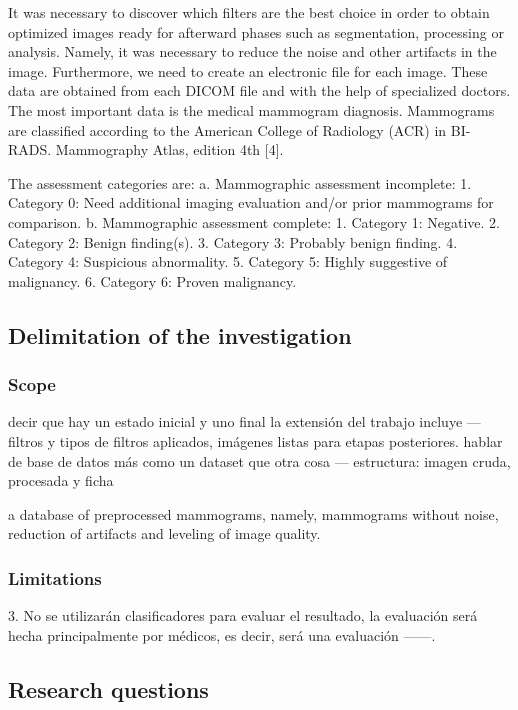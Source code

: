 It was necessary to discover which filters are the best choice in order to
obtain optimized images ready for afterward phases such as segmentation,
processing or analysis. Namely, it was necessary to reduce the noise and other
artifacts in the image. Furthermore, we need to create an electronic file for
each image. These data are obtained from each DICOM file and with the help of
specialized doctors.  The most important data is the medical mammogram
diagnosis. Mammograms are classified according to the American College of
Radiology (ACR) in BI-RADS. Mammography Atlas, edition 4th [4].

The assessment categories are:
a. Mammographic assessment incomplete:
1. Category 0: Need additional imaging evaluation and/or prior mammograms for comparison.
b. Mammographic assessment complete:
1. Category 1: Negative.
2. Category 2: Benign finding(s).
3. Category 3: Probably benign finding.
4. Category 4: Suspicious abnormality.
5. Category 5: Highly suggestive of malignancy.         
6. Category 6: Proven malignancy.

\subsection{Delimitation of the investigation}
\subsubsection{Scope}

decir que hay un estado inicial y uno final
la extensión del trabajo incluye --- filtros y tipos de filtros aplicados, imágenes listas para etapas posteriores. 
hablar de base de datos más como un dataset que otra cosa --- estructura: imagen cruda, procesada y ficha


a database of preprocessed mammograms, namely, mammograms without noise,
reduction of artifacts and leveling of image quality.

\subsubsection{Limitations}

3. No se utilizarán clasificadores para evaluar el resultado, la evaluación será
hecha principalmente por médicos, es decir, será una evaluación ------.

\subsection{Research questions}

